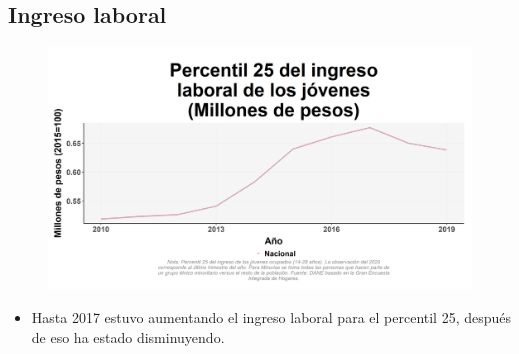     \subsection{Ingreso laboral}

    \begin{figure}[H]
        \caption[Percentil 25 del ingreso laboral de los jóvenes a nivel nacional ]{\label{inglab25jov_nal_trend} }
        \begin{center}
        \includegraphics[width=\textwidth,keepaspectratio]{img/var_13_trend.png}
        \end{center}
    \end{figure}
            \begin{itemize}
                \item Hasta 2017 estuvo aumentando el ingreso laboral para el percentil 25, después de eso ha estado disminuyendo.
                \end{itemize}

